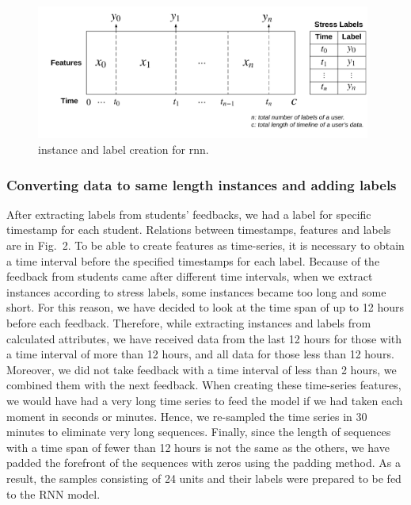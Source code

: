 \documentclass[3p,times,procedia]{elsarticle}
\begin{document}
\begin{figure}[t]\vspace*{4pt}
\centerline{\includegraphics[width=110mm]{graphics/Creating_Instances.png}}
\caption{instance and label creation for rnn.}
\end{figure}

\subsubsection{Converting data to same length instances and adding labels}
After extracting labels from students' feedbacks, we had a label for specific timestamp for each student. Relations between timestamps, features and labels are in Fig.~2. To be able to create features as time-series, it is necessary to obtain a time interval before the specified timestamps for each label. Because of the feedback from students came after different time intervals, when we extract instances according to stress labels, some instances became too long and some short. For this reason, we have decided to look at the time span of up to 12 hours before each feedback. Therefore, while extracting instances and labels from calculated attributes, we have received data from the last 12 hours for those with a time interval of more than 12 hours, and all data for those less than 12 hours. Moreover, we did not take feedback with a time interval of less than 2 hours, we combined them with the next feedback. When creating these time-series features, we would have had a very long time series to feed the model if we had taken each moment in seconds or minutes. Hence, we re-sampled the time series in 30 minutes to eliminate very long sequences. Finally, since the length of sequences with a time span of fewer than 12 hours is not the same as the others, we have padded the forefront of the sequences with zeros using the padding method. As a result, the samples consisting of 24 units and their labels were prepared to be fed to the RNN model. 
\end{document}
